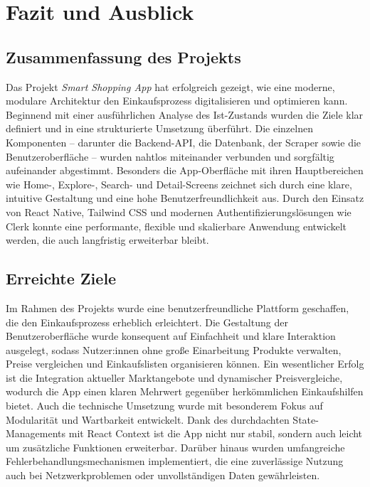 \documentclass[12pt, a4paper]{report} %
\newcommand{\authorinitials}{} %
\begin{document}


\chapter{Fazit und Ausblick}
\renewcommand{\authorinitials}{DH MK NK MT FK}
\label{chap:fazit}

\section{Zusammenfassung des Projekts}
Das Projekt \emph{Smart Shopping App} hat erfolgreich gezeigt, wie eine moderne, modulare Architektur den Einkaufsprozess digitalisieren und optimieren kann. Beginnend mit einer ausführlichen Analyse des Ist-Zustands wurden die Ziele klar definiert und in eine strukturierte Umsetzung überführt.  
Die einzelnen Komponenten – darunter die Backend-API, die Datenbank, der Scraper sowie die Benutzeroberfläche – wurden nahtlos miteinander verbunden und sorgfältig aufeinander abgestimmt. Besonders die App-Oberfläche mit ihren Hauptbereichen wie Home-, Explore-, Search- und Detail-Screens zeichnet sich durch eine klare, intuitive Gestaltung und eine hohe Benutzerfreundlichkeit aus.  
Durch den Einsatz von React Native, Tailwind CSS und modernen Authentifizierungslösungen wie Clerk konnte eine performante, flexible und skalierbare Anwendung entwickelt werden, die auch langfristig erweiterbar bleibt.

\section{Erreichte Ziele}
Im Rahmen des Projekts wurde eine benutzerfreundliche Plattform geschaffen, die den Einkaufsprozess erheblich erleichtert. Die Gestaltung der Benutzeroberfläche wurde konsequent auf Einfachheit und klare Interaktion ausgelegt, sodass Nutzer:innen ohne große Einarbeitung Produkte verwalten, Preise vergleichen und Einkaufslisten organisieren können.  
Ein wesentlicher Erfolg ist die Integration aktueller Marktangebote und dynamischer Preisvergleiche, wodurch die App einen klaren Mehrwert gegenüber herkömmlichen Einkaufshilfen bietet. Auch die technische Umsetzung wurde mit besonderem Fokus auf Modularität und Wartbarkeit entwickelt. Dank des durchdachten State-Managements mit React Context ist die App nicht nur stabil, sondern auch leicht um zusätzliche Funktionen erweiterbar. Darüber hinaus wurden umfangreiche Fehlerbehandlungsmechanismen implementiert, die eine zuverlässige Nutzung auch bei Netzwerkproblemen oder unvollständigen Daten gewährleisten.
\end{document}
